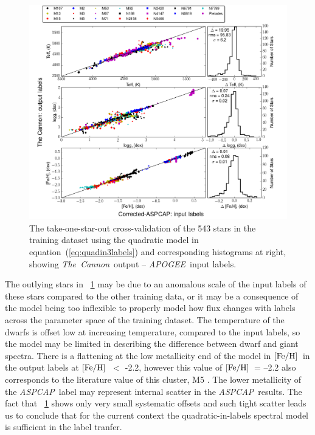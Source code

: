 \documentclass[12pt, preprint]{aastex}
\newcommand{\feh}{\mbox{$\rm [Fe/H]$}}
\newcommand{\tc}{\textsl{The~Cannon}}
\newcommand{\apogee}{\textsl{APOGEE}}
\newcommand{\aspcap}{\textsl{ASPCAP}}
\begin{document}
\begin{figure}[h!]
\centering
    \includegraphics[scale=0.45]{./plots/takeout_histc.png}
\caption{The take-one-star-out cross-validation of the 543 stars in the training dataset using the quadratic model in equation~(\ref{eq:quadin3labels}) and corresponding histograms at right, showing \tc\ output -- \apogee\ input labels.}
\label{fig:takeonestarout}
\end{figure}

The outlying stars in \figurename~\ref{fig:takeonestarout} may be due to an anomalous scale of the input labels of these stars compared to the other training data, or it may be a consequence of the model being too inflexible to properly model how flux changes with labels across the parameter space of the training dataset. 
The temperature of the dwarfs is offset low at increasing temperature, compared to the input labels, so the model may be limited in describing the difference between dwarf and giant spectra. 
There is a flattening at the low metallicity end of the model in \feh\ in the output labels at \feh\ $<$ -2.2, however this value of \feh\ = --2.2 also corresponds to the literature value of this cluster, M5 \citep{Meszaros2013}. 
The lower metallicity of the \aspcap\ label may represent internal scatter in the \aspcap\ results.
The fact that \figurename~\ref{fig:takeonestarout} shows only very small systematic offsets and such tight scatter leads us to conclude that for the
current context the quadratic-in-labels spectral model is sufficient in the label tranfer. 
\end{document}
